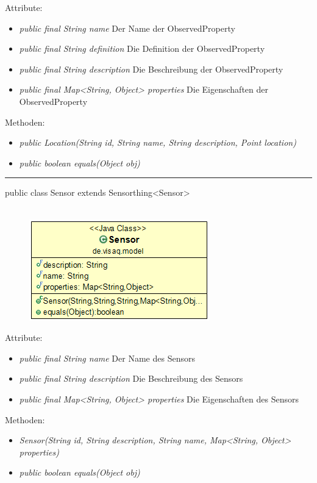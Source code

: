 Attribute:
\begin{itemize} 
	\item \emph{public final String name} Der Name der ObservedProperty
	\item \emph{public final String definition} Die Definition der ObservedProperty
	\item \emph{public final String description} Die Beschreibung der ObservedProperty
	\item \emph{public final Map<String, Object> properties} Die Eigenschaften der ObservedProperty
\end{itemize}
Methoden:
\begin{itemize} 
	\item \emph{public Location(String id, String name, String description, Point location)} 
	\item \emph{public boolean equals(Object obj)} 
\end{itemize}

\rule{\textwidth}{0.4pt}
public class Sensor extends Sensorthing<Sensor>
\\\\
\begin{minipage}{0.3\textwidth}
	\begin{figure}[H]
		\includegraphics[scale = 0.5
		]{media/frontend/model/SensorClass.png}
	\end{figure}
\end{minipage} \hfill
\begin{minipage}{0.6\textwidth}
\end{minipage}

Attribute:
\begin{itemize} 
	\item \emph{public final String name} Der Name des Sensors
	\item \emph{public final String description} Die Beschreibung des Sensors
	\item \emph{public final Map<String, Object> properties} Die Eigenschaften des Sensors
\end{itemize}
Methoden:
\begin{itemize} 
	\item \emph{Sensor(String id, String description, String name, Map<String, Object> properties)} 
	\item \emph{public boolean equals(Object obj)} 
\end{itemize}

